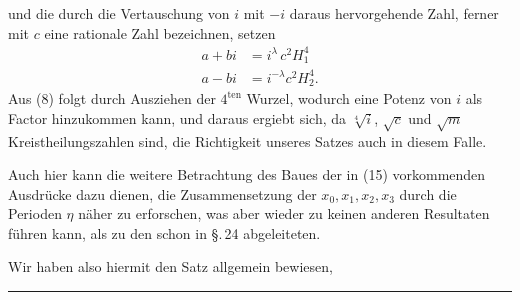 und die durch die Vertauschung von $i$ mit $-i$ daraus hervorgehende
 Zahl, ferner mit $c$ eine rationale Zahl bezeichnen, setzen
\[
\begin{aligned}
a + b i &= i^{\lambda}\, c^2 H_1^4\\
a - b i &= i^{-\lambda} c^2 H_2^4.
\end{aligned}
\]
Aus (8) folgt durch Ausziehen der $4^{\text{ten}}$ Wurzel, wodurch
eine Potenz von $i$ als Factor hinzukommen kann,
und daraus ergiebt sich, da $\sqrt[4]{i}$, $\sqrt{c}$ und $\sqrt{m}$ Kreistheilungszahlen
 sind, die Richtigkeit unseres Satzes auch in diesem Falle.

Auch hier kann die weitere Betrachtung des Baues der in
(15) vorkommenden Ausdr\"ucke dazu dienen, die Zusammensetzung
 der $x_0, x_1, x_2, x_3$ durch die Perioden $\eta$ n\"aher zu erforschen,
was aber wieder zu keinen anderen Resultaten f\"uhren
kann, als zu den schon in \S.\,24 abgeleiteten.

Wir haben also hiermit den Satz allgemein bewiesen, 

\rule{3cm}{0.4pt}
